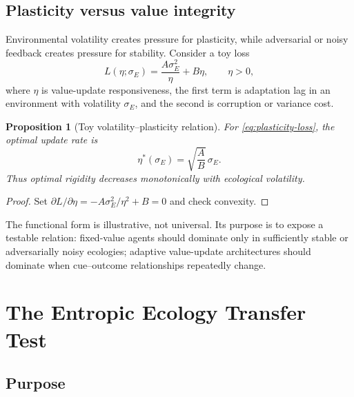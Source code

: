 \documentclass[11pt]{article}
\newtheorem{proposition}{Proposition}
\begin{document}
\subsection{Plasticity versus value integrity}

Environmental volatility creates pressure for plasticity, while adversarial or noisy feedback creates pressure for stability. Consider a toy loss
\begin{equation}
L(\eta;\sigma_E)
=
\frac{A\sigma_E^2}{\eta}
+B\eta,
\qquad \eta>0,
\label{eq:plasticity-loss}
\end{equation}
where $\eta$ is value-update responsiveness, the first term is adaptation lag in an environment with volatility $\sigma_E$, and the second is corruption or variance cost.

\begin{proposition}[Toy volatility--plasticity relation]
For \eqref{eq:plasticity-loss}, the optimal update rate is
\begin{equation}
\eta^*(\sigma_E)=\sqrt{\frac{A}{B}}\,\sigma_E.
\label{eq:optimal-plasticity}
\end{equation}
Thus optimal rigidity decreases monotonically with ecological volatility.
\end{proposition}

\begin{proof}
Set $\partial L/\partial\eta=-A\sigma_E^2/\eta^2+B=0$ and check convexity.
\end{proof}

The functional form is illustrative, not universal. Its purpose is to expose a testable relation: fixed-value agents should dominate only in sufficiently stable or adversarially noisy ecologies; adaptive value-update architectures should dominate when cue--outcome relationships repeatedly change.

\section{The Entropic Ecology Transfer Test}

\subsection{Purpose}
\end{document}
